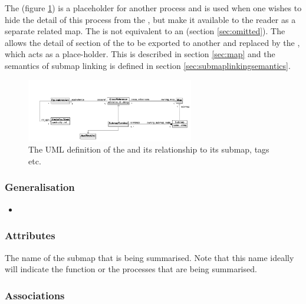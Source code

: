 The  (figure \ref{fig:submapnodeuml}) is a
placeholder for another process and is used when one wishes to hide
the detail of this process from the \PDm, but make it available to the
reader as a separate related map. The  is not
equivalent to an  (section
\ref{sec:omitted}). The  allows the detail of
section of the \PDm to be exported to another \PDm and replaced by the
, which acts as a place-holder.  This is
described in section \ref{sec:map} and the semantics of submap linking
is defined in section \ref{sec:submaplinkingsemantics}.

\begin{figure}[htb]
  \centering
  \includegraphics[width = 0.65\textwidth]{images/submapnodeuml}
  \caption{The UML definition of the  and its
   relationship to its submap, tags etc.}
  \label{fig:submapnodeuml}
\end{figure}

\subsubsection{Generalisation}

\begin{itemize}
\item {}
\end{itemize}

\subsubsection{Attributes}

\begin{attributes}
   The name of the submap that is being
  summarised. Note that this name ideally will indicate the function
  or the processes that are being summarised.
\end{attributes}

\subsubsection{Associations}

